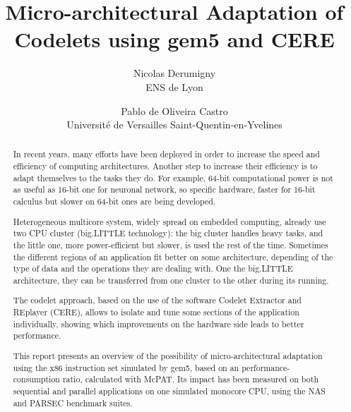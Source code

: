 \documentclass{article}
\title{Micro-architectural Adaptation of Codelets using gem5 and CERE}
\author{Nicolas Derumigny \\
\small ENS de Lyon 
\and Pablo de Oliveira Castro\\ 
\small Université de Versailles Saint-Quentin-en-Yvelines}
\date{}
\begin{document}
\maketitle

\smallskip

\begin{abstract}
In recent years, many efforts have been deployed in order to increase the speed and efficiency of computing architectures. Another step to increase their efficiency is to adapt themselves to the tasks they do. For example, 64-bit computational power is not as useful as 16-bit one for neuronal network, so specific hardware, faster for 16-bit calculus but slower on 64-bit ones are being developed.


Heterogeneous multicore system, widely spread on embedded computing, already use two CPU cluster (big.LITTLE technology): the big cluster handles heavy tasks, and the little one, more power-efficient but slower, is used the rest of the time. Sometimes the different regions of an application fit better on some architecture, depending of the type of data and the operations they are dealing with. One the big.LITTLE architecture, they can be transferred from one cluster to the other during its running. 


The codelet approach, based on the use of the software Codelet Extractor and REplayer (CERE), allows to isolate and tune some sections of the application individually, showing which improvements on the hardware side leads to better performance. 


This report presents an overview of the possibility of micro-architectural adaptation using the x86 instruction set simulated by gem5, based on an performance-consumption ratio, calculated with McPAT.
 Its impact has been measured on both sequential and parallel applications on one simulated monocore CPU, using the NAS and PARSEC benchmark suites. 

\end{abstract}
\end{document}
